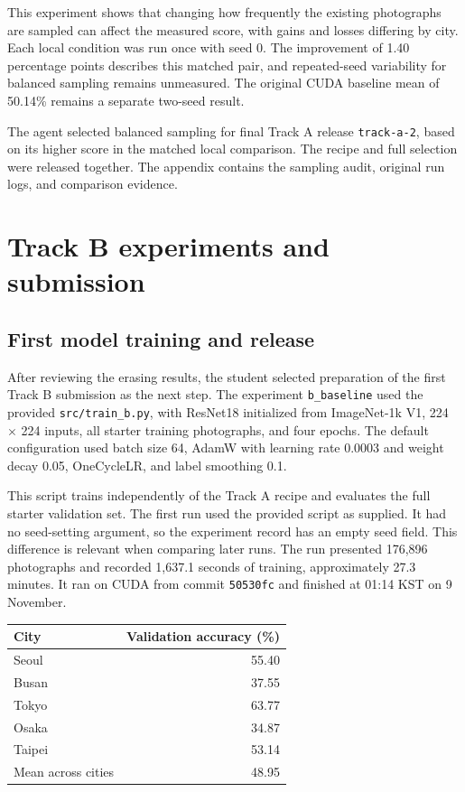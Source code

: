\documentclass[11pt]{article}
\begin{document}
This experiment shows that changing how frequently the existing photographs
are sampled can affect the measured score, with gains and losses differing
by city. Each local condition was run once with seed 0. The improvement
of 1.40 percentage points describes this matched pair, and repeated-seed
variability for balanced sampling remains unmeasured. The original CUDA
baseline mean of 50.14\% remains a separate two-seed result.

The agent selected balanced sampling for final Track A release
\texttt{track-a-2}, based on its higher score in the matched local comparison.
The recipe and full selection were released together. The appendix contains
the sampling audit, original run logs, and comparison evidence.

\section{Track B experiments and submission}

\subsection{First model training and release}

After reviewing the erasing results, the student selected preparation of the
first Track B submission as the next step. The experiment \texttt{b\_baseline}
used the provided \texttt{src/train\_b.py}, with ResNet18 initialized from
ImageNet-1k V1, 224 $\times$ 224 inputs, all starter training photographs,
and four epochs. The default configuration used batch size 64, AdamW with
learning rate 0.0003 and weight decay 0.05, OneCycleLR, and label smoothing 0.1.

This script trains independently of the Track A recipe and evaluates the
full starter validation set. The first run used the provided script as
supplied. It had no seed-setting argument, so the experiment record has an
empty seed field. This difference is relevant when comparing later runs.
The run presented 176,896 photographs and recorded 1,637.1 seconds of
training, approximately 27.3 minutes. It ran on CUDA from commit
\texttt{50530fc} and finished at 01:14 KST on 9 November.

\begin{center}\small
\begin{tabular}{lr}
\toprule
City & Validation accuracy (\%) \\
\midrule
Seoul & 55.40 \\
Busan & 37.55 \\
Tokyo & 63.77 \\
Osaka & 34.87 \\
Taipei & 53.14 \\
\midrule
Mean across cities & 48.95 \\
\bottomrule
\end{tabular}
\end{center}
\end{document}
